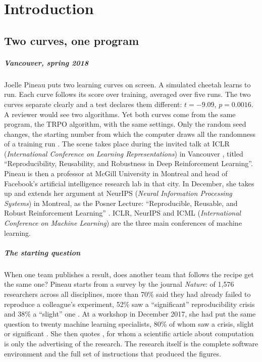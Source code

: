 \chapter{Introduction}\label{chap:01-introduction}

\section{Two curves, one program}\label{sec:intro-conferences}

\paragraph{Vancouver, spring 2018}
Joelle Pineau puts two learning curves on screen. A simulated cheetah learns to run. Each curve
follows its score over training, averaged over five runs. The two curves separate clearly and a test
declares them different: $t = -9.09$, $p = 0.0016$. A reviewer would see two algorithms. Yet both
curves come from the same program, the TRPO algorithm, with the same settings. Only the random seed
changes, the starting number from which the computer draws all the randomness of a training run
\parencite{henderson2018matters}. The scene takes place during the invited talk at ICLR
(\emph{International Conference on Learning Representations}) in Vancouver \parencite{pineau2018iclr},
titled \enquote{Reproducibility, Reusability, and Robustness in Deep Reinforcement Learning}. Pineau
is then a professor at McGill University in Montreal and head of Facebook's artificial intelligence
research lab in that city. In December, she takes up and extends her argument at NeurIPS
(\emph{Neural Information Processing Systems}) in Montreal, as the Posner Lecture:
\enquote{Reproducible, Reusable, and Robust Reinforcement Learning} \parencite{pineau2018neurips}.
ICLR, NeurIPS and ICML (\emph{International Conference on Machine Learning}) are the three main
conferences of machine learning.

\paragraph{The starting question}
When one team publishes a result, does another team that follows the recipe get the same one? Pineau
starts from a survey by the journal \emph{Nature}: of 1,576 researchers across all disciplines,
more than 70\% said they had already failed to reproduce a colleague's experiment, 52\% saw a
\enquote{significant} reproducibility crisis and 38\% a \enquote{slight} one
\parencite{baker2016reproducibility}. At a workshop in December 2017, she had put the same question to
twenty machine learning specialists, 80\% of whom saw a crisis, slight or significant
\parencite{pineau2018iclr}. She then quotes \textcite{buckheit1995wavelab}, for whom a scientific
article about computation is only the advertising of the research. The research itself is the complete
software environment and the full set of instructions that produced the figures.

